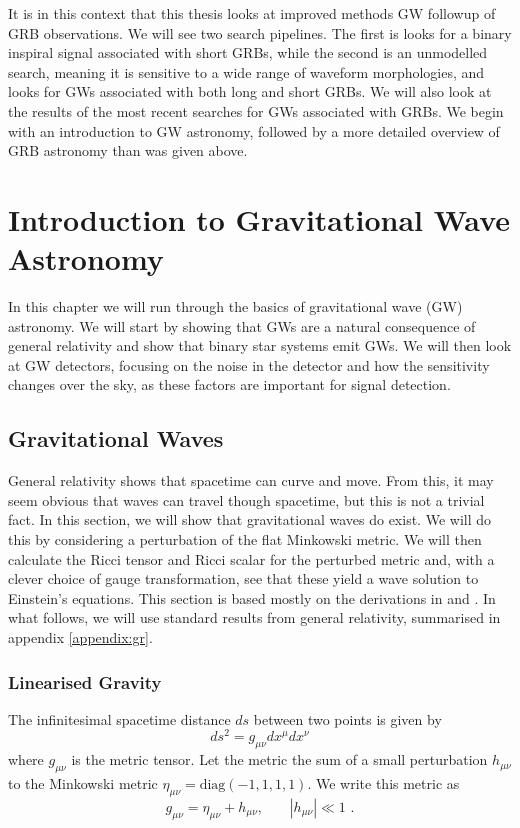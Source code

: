 \documentclass[11pt]{cuthesis}
\newcommand{\mn}{_{\mu\nu}}
\begin{document}
It is in this context that this thesis looks at improved methods GW followup of GRB observations. We will see two search pipelines. The first is looks for a binary inspiral signal associated with short GRBs, while the second is an unmodelled search, meaning it is sensitive to a wide range of waveform morphologies, and looks for GWs associated with both long and short GRBs. We will also look at the results of the most recent searches for GWs associated with GRBs. We begin with an introduction to GW astronomy, followed by a more detailed overview of GRB astronomy than was given above. 


\chapter{Introduction to Gravitational Wave Astronomy} \label{chap: gw bg}
In this chapter we will run through the basics of gravitational wave (GW) astronomy. We will start by showing that GWs are a natural consequence of general relativity and show that binary star systems emit GWs. We will then look at GW detectors, focusing on the noise in the detector and how the sensitivity changes over the sky, as these factors are important for signal detection.


\section{Gravitational Waves}
General relativity shows that spacetime can curve and move. From this, it may seem obvious that waves can travel though spacetime, but this is not a trivial fact. In this section, we will show that gravitational waves do exist. We will do this by considering a perturbation of the flat Minkowski metric. We will then calculate the Ricci tensor and Ricci scalar for the perturbed metric and, with a clever choice of gauge transformation, see that these yield a wave solution to Einstein's equations. This section is based mostly on the derivations in \cite{zee-einstein} and \cite{carroll-spacetime}. In what follows, we will use standard results from general relativity, summarised in appendix \ref{appendix:gr}.

\subsection{Linearised Gravity}
The infinitesimal spacetime distance $ds$ between two points is given by
\begin{equation}
ds^2 = g\mn dx^\mu dx^\nu
\end{equation}  
where $g\mn$ is the metric tensor. Let the metric the sum of a small perturbation $h_{\mu\nu}$ to the Minkowski metric $\eta\mn=\text{diag}(-1,1,1,1)$. We write this metric as 
\begin{equation} \label{pert metric}
g\mn=\eta_{\mu\nu}+h_{\mu\nu} \text{, } \hspace{20pt} |h_{\mu\nu}| \ll 1 \text{ .}
\end{equation}
\end{document}
